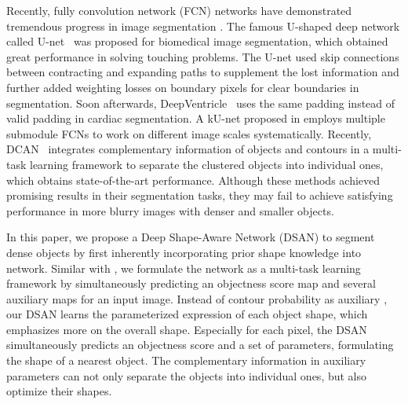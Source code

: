 Recently, fully convolution network (FCN) networks have demonstrated tremendous progress in image segmentation \cite{Long2015a,Chen2016d,Dai2015,Zheng2015}.
The famous U-shaped deep network called U-net~\cite{Ronneberger2015} was proposed for biomedical image segmentation, which obtained great performance in solving touching problems.
%
The U-net used skip connections between contracting and expanding paths to supplement the lost information and further added weighting losses on boundary pixels for clear boundaries in segmentation.
%
Soon afterwards, DeepVentricle~\cite{Lieman-Sifry2017} uses the same padding instead of valid padding in cardiac segmentation.
%
A kU-net proposed in \cite{Chen2016c} employs multiple submodule FCNs to work on different image scales systematically.
%
Recently, DCAN~\cite{Chen2017} integrates complementary information of objects and contours in a multi-task learning framework to separate the clustered objects into individual ones, which obtains state-of-the-art performance.
Although these methods achieved promising results in their segmentation tasks, they may fail to achieve satisfying performance in more blurry images with denser and smaller objects.



In this paper, we propose a Deep Shape-Aware Network (DSAN) to segment dense objects by first inherently incorporating prior shape knowledge into network.
Similar with \cite{Chen2017,Ren2015,Li2016a,Chen2016,Bertasius2016}, we formulate the network as a multi-task learning framework by simultaneously predicting an objectness score map and several auxiliary maps for an input image.
Instead of contour probability as auxiliary \cite{Chen2017,Chen2016,Bertasius2016}, our DSAN learns the parameterized expression of each object shape, which emphasizes more on the overall shape.
%
Especially for each pixel, the DSAN simultaneously predicts an objectness score and a set of parameters, formulating the shape of a nearest object.
The complementary information in auxiliary parameters can not only separate the objects into individual ones, but also optimize their shapes.

